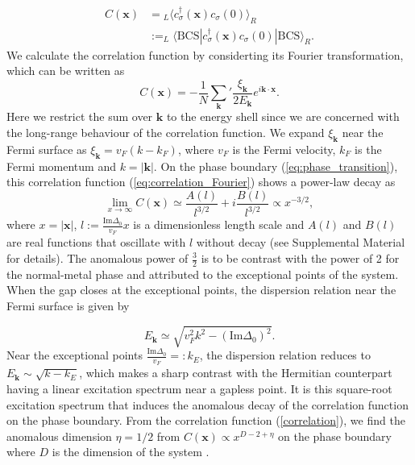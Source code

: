 \documentclass[aps,prl,twocolumn,nofootinbib,superscriptaddress,notitlepage,longbibliography]{revtex4-1}
\begin{document}
	\begin{align}
	C(\bm{x})&={}_{L}\langle c_{\sigma}^{\dagger}(\bm{x})c_{\sigma}(0)\rangle_{R}\nonumber\\
	&:=_{L}\langle\text{BCS}|c_{\sigma}^{\dagger}(\bm{x})c_{\sigma}(0)|\text{BCS}\rangle_{R}.
	\end{align}
 We calculate the correlation function by considerting its Fourier transformation, which can be written as
 \begin{equation}
 	C (\bm{x}) = -\frac{1}{N}\sum_{\bm{k}}^{}{'} \frac{\xi_{\bm{k}}}{2 E_{\bm{k}}} e^{i\bm{k} \cdot \bm{x}}.\label{eq:correlation_Fourier}
 \end{equation}
  Here we restrict the sum over $\bm{k}$ to the energy shell since we are concerned with the long-range behaviour of the correlation function. We expand $\xi_{\bm{k}}$ near the Fermi surface as $\xi_{{\bm{k}}}=v_F(k-k_F)$, where $v_F$ is the Fermi velocity, $k_F$ is the Fermi momentum and $k=|\bm{k}|$. On the phase boundary (\ref{eq:phase_transition}), this correlation function (\ref{eq:correlation_Fourier}) shows a power-law decay as
	\begin{equation}
	\lim_{x\rightarrow\infty}C (\bm{x})\simeq\frac{A(l)}{l^{3/2}}+i\frac{B(l)}{l^{3/2}}\propto x^{-3/2},\label{correlation}
	\end{equation}
	where $x=|\bm{x}|$, $l:=\frac{\text{Im}\Delta_{0}}{v_{F}}x$ is a dimensionless length scale and $A(l)$ and $B(l)$ are real functions  that oscillate with $l$ without decay (see Supplemental Material \cite{SupplementaryMaterial} for details). The anomalous power of $\frac{3}{2}$ is to be contrast with the power of 2 for the normal-metal phase \cite{Sachdev:2011uj} and attributed to the exceptional points of the system.  When the gap closes at the exceptional points, the dispersion relation near the Fermi surface is given by
	
	\begin{equation}
	E_{\bm{k}}\simeq\sqrt{v_{F}^{2}k^{2}-(\text{Im}\Delta_{0})^{2}}.
	\end{equation}
	Near the exceptional points $\frac{\text{Im}\Delta_{0}}{v_{F}}=:k_{E}$,
	the dispersion relation reduces to $E_{\bm{k}}\sim\sqrt{k-k_{E}}$,
	which makes a sharp contrast with the Hermitian counterpart having a
	linear excitation spectrum near a gapless point. It is this square-root
	excitation spectrum that induces the
	anomalous decay of the correlation function on the phase boundary. From the correlation function (\ref{correlation}), we find the anomalous dimension $\eta=1/2$ from $C(\bm{x})\propto x^{D-2+\eta}$ on the phase boundary where $D$ is the dimension of the system \cite{Sachdev:2011uj}.
	
\end{document}
